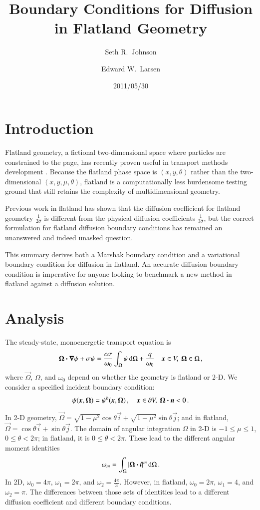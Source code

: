 \documentclass{anstrans}
\title{Boundary Conditions for Diffusion in Flatland Geometry}
\author{Seth R.~Johnson \and Edward W.~Larsen}
\institute{Department of Nuclear Engineering \& Radiological Sciences, University of Michigan, Ann Arbor, MI, 48109}
\date{2011/05/30}
\begin{document}
\section{Introduction}
Flatland geometry, a fictional two-dimensional space where particles are
constrained to the page, has recently proven useful in
transport methods development \cite{Asa2008,Lar2009c}. Because the flatland phase
space is $(x,y,\theta)$ rather than the two-dimensional $(x,y,\mu,\theta)$,
flatland
is a computationally less burdensome testing ground that still retains the
complexity of multidimensional geometry.

Previous work in flatland has shown that the diffusion
coefficient for flatland geometry $\frac{1}{2\sigma}$ is different from
the physical diffusion coefficients $\frac{1}{3\sigma}$, but the correct
formulation for flatland diffusion boundary conditions has remained an
unanswered and indeed unasked question.

This summary derives both a Marshak boundary condition and a variational
boundary condition for diffusion in flatland. An accurate diffusion boundary
condition is imperative for anyone looking to benchmark a new method in
flatland against a diffusion solution.

\section{Analysis}
The steady-state, monoenergetic transport equation is
\begin{equation}\label{eq:generalTransport}
  \bm{\Omega}\bm{\cdot} \bm{\nabla} \psi + \sigma \psi
  = \frac{c \sigma}{\omega_0} \int_{\Omega} \psi \mathop{}\!\mathrm{d}\Omega + \frac{q}{\omega_0}
  \quad \bm{x}\in V,\ \bm{\Omega}\in \Omega \,,
\end{equation}
where $\vec{\Omega}$, $\Omega$, and $\omega_0$ depend on whether the geometry
is flatland or 2-D. We consider a specified incident boundary condition:
\begin{equation} \label{eq:ssBndy}
  \psi(\bm{x}, \bm{\Omega}) = \psi^b(\bm{x}, \bm{\Omega})\,,
  \quad \bm{x}\in \partial V,\ \bm{\Omega} \bm{\cdot} \bm{n} < 0\,.
\end{equation}

In 2-D geometry, $\vec{\Omega}=\sqrt{1-\mu^2} \cos \theta \vec{i} +
\sqrt{1-\mu^2} \sin \theta \vec{j}$; and in flatland, $\vec{\Omega}=\cos \theta
\vec{i} + \sin \theta \vec{j}$. The domain of angular integration $\Omega$ in
2-D is $-1\le\mu\le1$, $0 \le \theta < 2\pi$; in flatland, it is $0 \le \theta
< 2\pi$. These lead to the different angular moment identities
\begin{equation}\label{eq:omegaIdentities}
  \omega_m = \int_{\Omega} \left| \bm{\Omega}\bm{\cdot} \bm{i} \right|^m \mathop{}\!\mathrm{d}\Omega\,.
\end{equation}
In 2D, $\omega_0=4\pi$, $\omega_1=2\pi$, and $\omega_2=\frac{4\pi}{3}$.
However, in flatland, $\omega_0=2\pi$, $\omega_1=4$, and $\omega_2=\pi$. The
differences between those sets of identities lead to a different diffusion 
coefficient and different boundary conditions.
\end{document}
